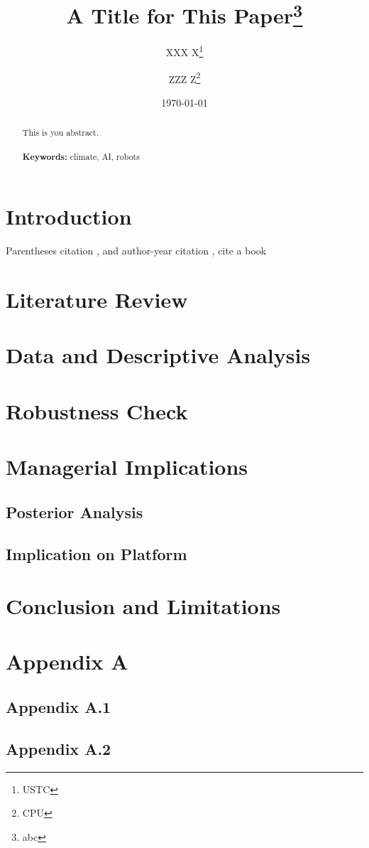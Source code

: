 \documentclass[a4paper, 12pt]{article}
\begin{document}
\begin{titlepage}
    \title{A Title for This Paper\thanks{abc}}
    \author{XXX X\thanks{USTC} \and ZZZ  Z\thanks{CPU}}
    \date{\today}
    \maketitle
    \begin{abstract}
        \noindent 
        This is you abstract.
        \\
        \vspace{0in}\\
        \noindent\textbf{Keywords:} climate, AI, robots\\
        \bigskip
    \end{abstract}
    \setcounter{page}{0}
    \thispagestyle{empty}
\end{titlepage}
\pagebreak \newpage
\doublespacing
\section{Introduction}
Parentheses citation \citep{DunningHuchetteLubin2017,DunningHuchetteLubin2017}, and author-year citation \citet{DunningHuchetteLubin2017}, cite a book \citep[\S 2.1.1]{DunningHuchetteLubin2017}
\section{Literature Review}
\section{Data and Descriptive Analysis}
\section{Robustness Check}
\section{Managerial Implications}
\subsection{Posterior Analysis}
\subsection{Implication on Platform}
\section{Conclusion and Limitations}
\clearpage


\clearpage
\section*{Appendix A}
\subsection*{Appendix A.1}
\subsection*{Appendix A.2}
\end{document}

